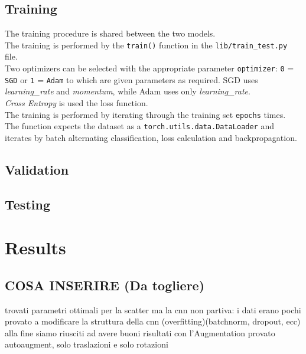 \documentclass{report}
\begin{document}
\section{Training}
The training procedure is shared between the two models. \\
The training is performed by the \texttt{train()} function in the \texttt{lib/train\_test.py} file. \\

Two optimizers can be selected with the appropriate parameter \texttt{optimizer}: \texttt{0} = \texttt{SGD} or \texttt{1} = \texttt{Adam} to which are given parameters
as required. SGD uses \textit{learning\_rate} and \textit{momentum}, while Adam uses only \textit{learning\_rate}. \\
\textit{Cross Entropy} is used the loss function. \\

The training is performed by iterating through the training set \texttt{epochs} times. \\
The function expects the dataset as a \texttt{torch.utils.data.DataLoader} and iterates by batch alternating classification, loss calculation and backpropagation.\\


\section{Validation}
\section{Testing}

\chapter{Results}
\section{COSA INSERIRE (Da togliere)}
trovati parametri ottimali per la scatter
ma la cnn non partiva: i dati erano pochi
provato a modificare la struttura della cnn (overfitting)(batchnorm, dropout, ecc)
alla fine siamo riusciti ad avere buoni risultati con l'Augmentation
provato autoaugment, solo traslazioni e solo rotazioni
\end{document}
